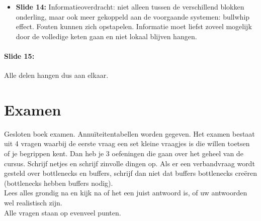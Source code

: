 \documentclass[10pt,a4paper]{report}
\begin{document}
\begin{itemize}
\begin{itemize}
\begin{itemize}
\begin{itemize}
\begin{figure}[h!]
\centering
\texttt{[image: Les22\_06.png]}
\caption{Les 22, Slideset 16 Slide 13 (3)} 
\label{les22_06}
\end{figure}
	
\end{itemize}	
			
\item multimodaal: alles met vrachtwagen, of met boten?
\item kostenstructuur en de tijden: het kan zijn dat je zegt dat je met de vrachtgen rijdt. Afhankelijk van de afstand krijg je een lineaire kost. Je kan ook gebruik maken van een boot, waarbij je eerst een stuk rijdt met de vrachtwagen en dan een transfer doet (van vrachtwagen naarboot), dan krijg je een afstand waarvan de kost lager is en dan terug een overslag en dan terug uw vrachtwagen die verder rijdt. Afhankelijk van de afstand en de kostenstructuur kan het zijn dat je combinaties maakt of alleen maar 1 transportmedium gebruikt. Zie Figuur \ref{les22_07}.

\begin{figure}[h!]
\centering
\texttt{[image: Les22\_07.png]}
\caption{Les 22, Slideset 16 Slide 13 (4)} 
\label{les22_07}
\end{figure}
			
\end{itemize}
\item Je krijgt zo een ganse reeks problemen.
\end{itemize}
\item \textbf{Slide 14:} Informatieoverdracht: niet alleen tussen de verschillend blokken onderling, maar ook meer gekoppeld aan de voorgaande systemen: bullwhip effect. Fouten kunnen zich opstapelen. Informatie moet liefst zoveel mogelijk door de volledige keten gaan en niet lokaal blijven hangen.
\end{itemize}

\paragraph{Slide 15:} Alle delen hangen dus aan elkaar. 

\section{Examen} Gesloten boek examen. Annu\"iteitentabellen worden gegeven. Het examen bestaat uit 4 vragen waarbij de eerste vraag een set kleine vraagjes is die willen toetsen of je begrippen kent. Dan heb je 3 oefeningen die gaan over het geheel van de cursus. Schrijf netjes en schrijf zinvolle dingen op. Als er een verbandvraag wordt gesteld over bottlenecks en buffers, schrijf dan niet dat buffers bottlenecks cre\"eren (bottlenecks hebben buffers nodig).\\
Lees alles grondig na en kijk na of het een juist antwoord is, of uw antwoorden wel realistisch zijn. \\
Alle vragen staan op evenveel punten.
\end{document}
